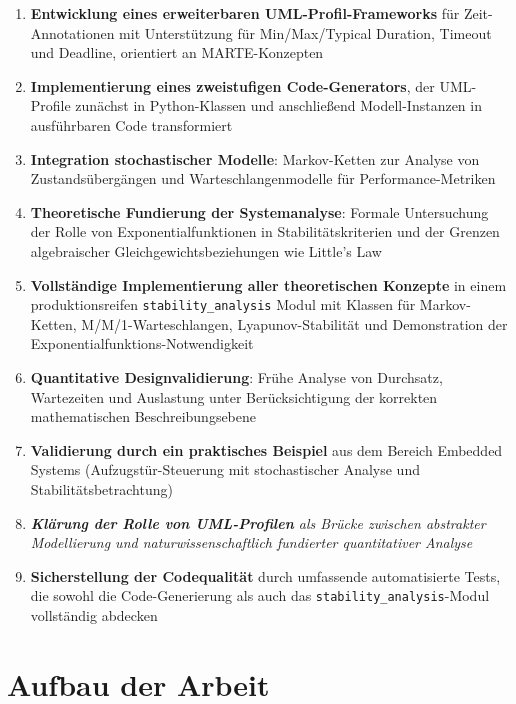 ﻿\documentclass[a4paper,12pt]{report}
\theoremstyle{definition}
\begin{document}
\begin{enumerate}
	\item[-] \textbf{Entwicklung eines erweiterbaren UML-Profil-Frameworks} für Zeit-Anno\-tationen mit Unterstützung für Min/Max/Typical Duration, Timeout und Deadline, orientiert an MARTE-Konzepten
	
	\item[-] \textbf{Implementierung eines zweistufigen Code-Generators}, der UML-Profile zu\-nächst in Python-Klassen und anschließend Modell-Instanzen in ausführbaren Code transformiert
	
	\item[-] \textbf{Integration stochastischer Modelle}: Markov-Ketten zur Analyse von Zustands\-übergängen und Warteschlangenmodelle für Performance-Metriken
	
	\item[-] \textbf{Theoretische Fundierung der Systemanalyse}: Formale Untersuchung der Rolle von Exponentialfunktionen in Stabilitätskriterien und der Grenzen algebraischer Gleichgewichtsbeziehungen wie Little's Law
	
	\item[-] \textbf{Vollständige Implementierung aller theoretischen Konzepte} in einem produktionsreifen \texttt{stability\_analysis} Modul mit Klassen für Markov-Ketten, M/M/1-Warteschlangen, Lyapunov-Stabilität und Demonstration der Exponentialfunktions-Notwendigkeit
	
	\item[-] \textbf{Quantitative Designvalidierung}: Frühe Analyse von Durchsatz, Wartezeiten und Auslastung unter Berücksichtigung der korrekten mathematischen Beschreibungsebene
	
	\item[-] \textbf{Validierung durch ein praktisches Beispiel} aus dem Bereich Embedded Systems (Aufzugstür-Steuerung mit stochastischer Analyse und Stabilitätsbetrachtung)
	
	\item[-] \textit{\textbf{Klärung der Rolle von UML-Profilen} als Brücke zwischen abstrakter Modellierung und naturwissenschaftlich fundierter quantitativer Analyse}
	
    \item[-] \textbf{Sicherstellung der Codequalität} durch umfassende
	automatisierte Tests, die sowohl die Code-Generierung als auch
	das \texttt{stability\_analysis}-Modul vollständig abdecken
\end{enumerate}

\section{Aufbau der Arbeit}
\end{document}
